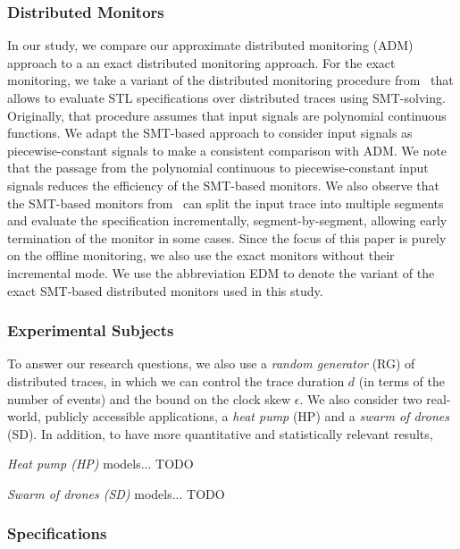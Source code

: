 \subsubsection{Distributed Monitors} \label{sec:testGeneration}
In our study, we compare our approximate distributed monitoring (ADM) approach to a an exact distributed monitoring approach. For the exact monitoring, we take a variant of the distributed monitoring procedure from~\cite{borzoo} that allows to evaluate STL specifications over distributed traces using SMT-solving. Originally, that procedure assumes that input signals are polynomial continuous functions. We adapt the SMT-based approach to consider input signals as piecewise-constant signals to make a consistent comparison with ADM. We note that the passage from the polynomial continuous to piecewise-constant input signals reduces the efficiency of the SMT-based monitors. We also observe that the SMT-based monitors from~\cite{borzoo} can split the input trace into multiple segments and evaluate the specification incrementally, segment-by-segment, allowing early termination of the monitor in some cases. Since the focus of this paper is purely on the offline monitoring, we also use the exact monitors without their incremental mode. We use the abbreviation EDM to denote the variant of the exact SMT-based distributed monitors used in this study.


\subsubsection{Experimental Subjects}
To answer our research questions, we also use a \emph{random generator} (RG) of distributed traces, in which we can control the trace duration $d$ (in terms of the number of events) and the bound on the clock skew $\epsilon$.
%
We also consider two real-world, publicly accessible applications, a \emph{heat pump} (HP) and a \emph{swarm of drones} (SD). In addition, to have more quantitative and statistically relevant results,  

\noindent \emph{Heat pump (HP)} models...
\alert{TODO}

\noindent \emph{Swarm of drones (SD)} models...
\alert{TODO}

\subsubsection{Specifications}

